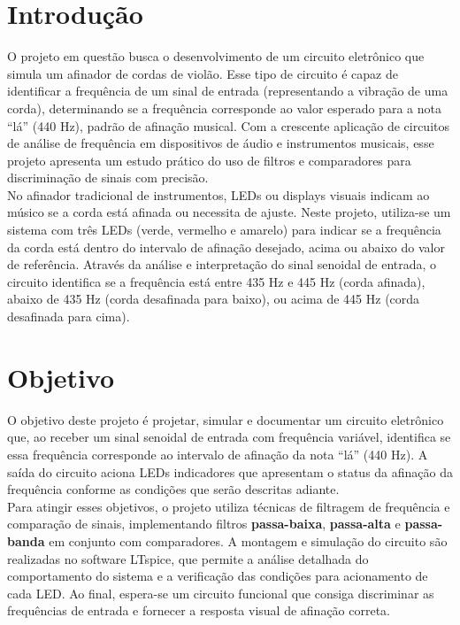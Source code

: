 \documentclass[a4paper, 12pt]{article}
\begin{document}
\newpage
\tableofcontents
\thispagestyle{empty}

\newpage
\listoffigures
\thispagestyle{empty}

\newpage
{}


\section{Introdução}
O projeto em questão busca o desenvolvimento de um circuito eletrônico que simula um afinador de cordas de violão. Esse tipo de circuito é capaz de identificar a frequência de um sinal de entrada (representando a vibração de uma corda), determinando se a frequência corresponde ao valor esperado para a nota “lá” (440 Hz), padrão de afinação musical. Com a crescente aplicação de circuitos de análise de frequência em dispositivos de áudio e instrumentos musicais, esse projeto apresenta um estudo prático do uso de filtros e comparadores para discriminação de sinais com precisão.\\

No afinador tradicional de instrumentos, LEDs ou displays visuais indicam ao músico se a corda está afinada ou necessita de ajuste. Neste projeto, utiliza-se um sistema com três LEDs (verde, vermelho e amarelo) para indicar se a frequência da corda está dentro do intervalo de afinação desejado, acima ou abaixo do valor de referência. Através da análise e interpretação do sinal senoidal de entrada, o circuito identifica se a frequência está entre 435 Hz e 445 Hz (corda afinada), abaixo de 435 Hz (corda desafinada para baixo), ou acima de 445 Hz (corda desafinada para cima).

\newpage
\section{Objetivo}
O objetivo deste projeto é projetar, simular e documentar um circuito eletrônico que, ao receber um sinal senoidal de entrada com frequência variável, identifica se essa frequência corresponde ao intervalo de afinação da nota “lá” (440 Hz). A saída do circuito aciona LEDs indicadores que apresentam o status da afinação da frequência conforme as condições que serão descritas adiante.\\

Para atingir esses objetivos, o projeto utiliza técnicas de filtragem de frequência e comparação de sinais, implementando filtros \textbf{passa-baixa}, \textbf{passa-alta} e \textbf{passa-banda} em conjunto com comparadores. A montagem e simulação do circuito são realizadas no software LTspice, que permite a análise detalhada do comportamento do sistema e a verificação das condições para acionamento de cada LED. Ao final, espera-se um circuito funcional que consiga discriminar as frequências de entrada e fornecer a resposta visual de afinação correta.
\end{document}
